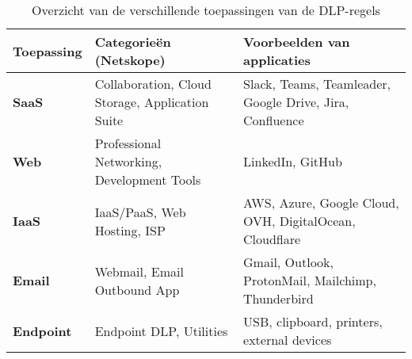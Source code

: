 \begin{table}[h]
    \centering
    \small
    \begin{tabular}{lll}
        \toprule
        \textbf{Toepassing} & \textbf{Categorieën (Netskope)} & \textbf{Voorbeelden van applicaties} \\
        \midrule
        \textbf{SaaS}     & Collaboration, Cloud Storage, Application Suite & Slack, Teams, Teamleader, Google Drive, Jira, Confluence \\
        \textbf{Web}      & Professional Networking, Development Tools & LinkedIn, GitHub \\
        \textbf{IaaS}     & IaaS/PaaS, Web Hosting, ISP & AWS, Azure, Google Cloud, OVH, DigitalOcean, Cloudflare \\
        \textbf{Email}    & Webmail, Email Outbound App & Gmail, Outlook, ProtonMail, Mailchimp, Thunderbird \\
        \textbf{Endpoint} & Endpoint DLP, Utilities & USB, clipboard, printers, external devices \\
        \bottomrule
    \end{tabular}
    \caption{Overzicht van de verschillende toepassingen van de DLP-regels}
    \label{tab:toepassingen}
\end{table}



\subsection{}
\label{subsubsec:saas-poc}





